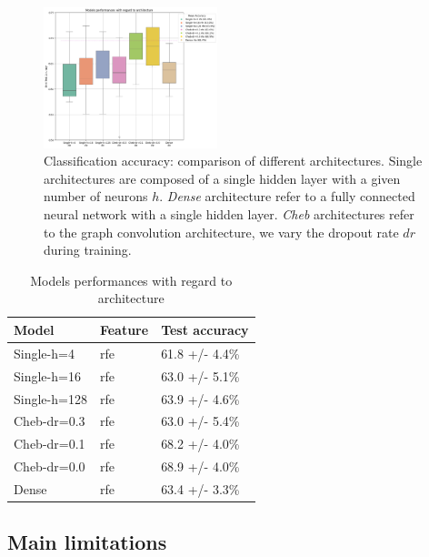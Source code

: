 \begin{figure}[h!]
    \centering
    \includegraphics[width=0.45\textwidth]{figures/model_performances_architecture.png}
    \caption{Classification accuracy: comparison of different architectures.
    Single architectures are composed of a single hidden layer with a given number of neurons $h$.
    \textit{Dense} architecture refer to a fully connected neural network with a single hidden layer.
    \textit{Cheb} architectures refer to the graph convolution architecture, we vary the dropout rate $dr$
    during training.}
    \Description{}
    \label{fig:results_architecture}
\end{figure}

\begin{table}[H]
	\begin{center}
		\begin{tabular}{lll}
			Model & Feature & Test accuracy \\
			\hline
			Single-h=4 & rfe & 61.8 +/- 4.4\% \\
			Single-h=16 & rfe & 63.0 +/- 5.1\% \\
			Single-h=128 & rfe & 63.9 +/- 4.6\% \\
			Cheb-dr=0.3 & rfe & 63.0 +/- 5.4\% \\
			Cheb-dr=0.1 & rfe & 68.2 +/- 4.0\% \\
			Cheb-dr=0.0 & rfe & 68.9 +/- 4.0\% \\
			Dense & rfe & 63.4 +/- 3.3\% \\
		\end{tabular}
	\end{center}
	\caption{Models performances with regard to architecture}
	\label{table:dependance_on_architecture}
\end{table}




\subsection{Main limitations}


